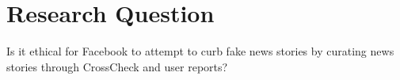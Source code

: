 
\section{Research Question}

Is it ethical for Facebook to attempt to curb fake news stories by curating news stories through CrossCheck and user reports?